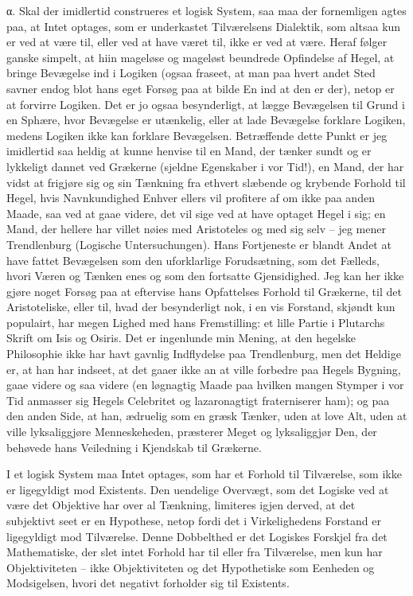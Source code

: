 \documentclass[12pt,a4paper]{article}
\begin{document}
α. Skal der imidlertid construeres et logisk System, saa maa der fornemligen agtes paa, at Intet optages, som er underkastet Tilværelsens Dialektik, som altsaa kun er ved at være til, eller ved at have været til, ikke er ved at være. Heraf følger ganske simpelt, at hiin mageløse og mageløst beundrede Opfindelse af Hegel, at bringe Bevægelse ind i Logiken (ogsaa fraseet, at man paa hvert andet Sted savner endog blot hans eget Forsøg paa at bilde En ind at den er der), netop er at forvirre Logiken. Det er jo ogsaa besynderligt, at lægge Bevægelsen til Grund i en Sphære, hvor Bevægelse er utænkelig, eller at lade Bevægelse forklare Logiken, medens Logiken ikke kan forklare Bevægelsen. Betræffende dette Punkt er jeg imidlertid saa heldig at kunne henvise til en Mand, der tænker sundt og er lykkeligt dannet ved Grækerne (sjeldne Egenskaber i vor Tid!), en Mand, der har vidst at frigjøre sig og sin Tænkning fra ethvert slæbende og krybende Forhold til Hegel, hvis Navnkundighed Enhver ellers vil profitere af om ikke paa anden Maade, saa ved at gaae videre, det vil sige ved at have optaget Hegel i sig; en Mand, der hellere har villet nøies med Aristoteles og med sig selv – jeg mener Trendlenburg (Logische Untersuchungen). Hans Fortjeneste er blandt Andet at have fattet Bevægelsen som den uforklarlige Forudsætning, som det Fælleds, hvori Væren og Tænken enes og som den fortsatte Gjensidighed. Jeg kan her ikke gjøre noget Forsøg paa at eftervise hans Opfattelses Forhold til Grækerne, til det Aristoteliske, eller til, hvad der besynderligt nok, i en vis Forstand, skjøndt kun populairt, har megen Lighed med hans Fremstilling: et lille Partie i Plutarchs Skrift om Isis og Osiris. Det er ingenlunde min Mening, at den hegelske Philosophie ikke har havt gavnlig Indflydelse paa Trendlenburg, men det Heldige er, at han har indseet, at det gaaer ikke an at ville forbedre paa Hegels Bygning, gaae videre og saa videre (en løgnagtig Maade paa hvilken mangen Stymper i vor Tid anmasser sig Hegels Celebritet og lazaronagtigt fraterniserer ham); og paa den anden Side, at han, ædruelig som en græsk Tænker, uden at love Alt, uden at ville lyksaliggjøre Menneskeheden, præsterer Meget og lyksaliggjør Den, der behøvede hans Veiledning i Kjendskab til Grækerne.

I et logisk System maa Intet optages, som har et Forhold til Tilværelse, som ikke er ligegyldigt mod Existents. Den uendelige Overvægt, som det Logiske ved at være det Objektive har over al Tænkning, limiteres igjen derved, at det subjektivt seet er en Hypothese, netop fordi det i Virkelighedens Forstand er ligegyldigt mod Tilværelse. Denne Dobbelthed er det Logiskes Forskjel fra det Mathematiske, der slet intet Forhold har til eller fra Tilværelse, men kun har Objektiviteten – ikke Objektiviteten og det Hypothetiske som Eenheden og Modsigelsen, hvori det negativt forholder sig til Existents.
\end{document}
